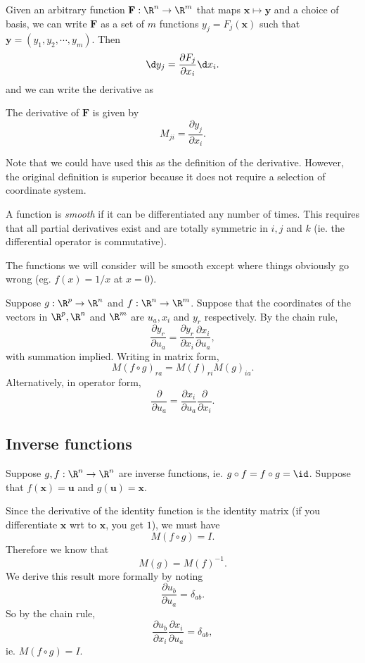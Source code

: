 \documentclass[a4paper]{article}
\begin{document}
Given an arbitrary function $\mathbf{F}: \R^n \to \R^m$ that maps $\mathbf{x}\mapsto \mathbf{y}$ and a choice of basis, we can write $\mathbf{F}$ as a set of $m$ functions $y_j = F_j(\mathbf{x})$ such that $\mathbf{y} = (y_1, y_2, \cdots, y_m)$. Then
\[
  \d y_j = \frac{\partial F_j}{\partial x_i} \d x_i.
\]
and we can write the derivative as
\begin{thm}
  The derivative of $\mathbf{F}$ is given by
  \[
    M_{ji} =\frac{\partial y_j}{\partial x_i}.
  \]
\end{thm}
Note that we could have used this as the definition of the derivative. However, the original definition is superior because it does not require a selection of coordinate system.

\begin{defi}
  A function is \emph{smooth} if it can be differentiated any number of times. This requires that all partial derivatives exist and are totally symmetric in $i, j$ and $k$ (ie. the differential operator is commutative).
\end{defi}
The functions we will consider will be smooth except where things obviously go wrong (eg. $f(x) = 1/x$ at $x = 0$).

\begin{thm}
  Suppose $g: \R^p\to\R^n$ and $f: \R^n \to \R^m$. Suppose that the coordinates of the vectors in $\R^p, \R^n$ and $\R^m$ are $u_a, x_i$ and $y_r$ respectively. By the chain rule,
  \[
    \frac{\partial y_r}{\partial u_a} = \frac{\partial y_r}{\partial x_i}\frac{\partial x_i}{\partial u_a},
  \]
  with summation implied. Writing in matrix form,
  \[
    M(f\circ g)_{ra} = M(f)_{ri}M(g)_{ia}.
  \]
  Alternatively, in operator form,
  \[
    \frac{\partial}{\partial u_a} = \frac{\partial x_i}{\partial u_a}\frac{\partial}{\partial x_i}.
  \]
\end{thm}

\subsection{Inverse functions}
Suppose $g, f: \R^n \to \R^n$ are inverse functions, ie. $g\circ f = f\circ g = \id$. Suppose that $f(\mathbf{x}) =\mathbf{u}$ and $g(\mathbf{u}) = \mathbf{x}$.

Since the derivative of the identity function is the identity matrix (if you differentiate $\mathbf{x}$ wrt to $\mathbf{x}$, you get $1$), we must have
\[
  M(f\circ g) = I.
\]
Therefore we know that
\[
  M(g) = M(f)^{-1}.
\]
We derive this result more formally by noting
\[
  \frac{\partial u_b}{\partial u_a} = \delta_{ab}.
\]
So by the chain rule,
\[
  \frac{\partial u_b}{\partial x_i}\frac{\partial x_i}{\partial u_a} = \delta_{ab},
\]
ie. $M(f\circ g) = I$.
\end{document}
